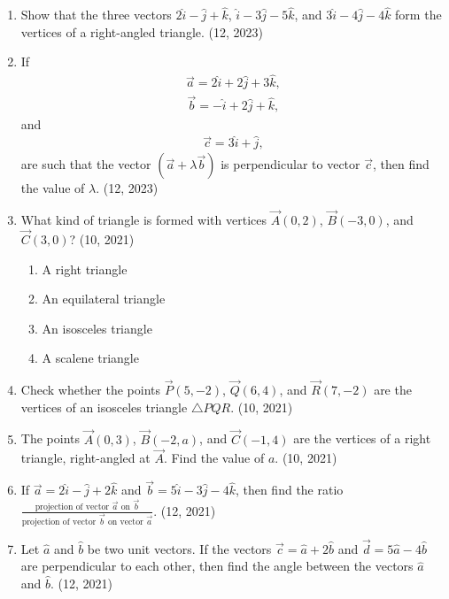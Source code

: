 \begin{enumerate}[label=\thesubsection.\arabic*, ref=\thesubsection.\theenumi]
    \item Show that the three vectors $2\hat{i} - \hat{j} + \hat{k}$, $\hat{i} - 3\hat{j} - 5\hat{k}$, and $3\hat{i} - 4\hat{j} - 4\hat{k}$ form the vertices of a right-angled triangle. 
    \hfill (12, 2023)
    \item If
    \begin{align}
        \overrightarrow{a} = 2\hat{i} + 2\hat{j} + 3\hat{k},
    \end{align}
    \begin{align}
        \overrightarrow{b} = -\hat{i} + 2\hat{j} + \hat{k},
    \end{align}
    and
    \begin{align}
        \overrightarrow{c} = 3\hat{i} + \hat{j},
    \end{align}
    are such that the vector $(\overrightarrow{a} + \lambda \overrightarrow{b})$ is perpendicular to vector $\overrightarrow{c}$, then find the value of $\lambda$.
    \hfill (12, 2023)
		\item What kind of triangle is formed with vertices $\vec{A}(0, 2)$, $\vec{B}(-3, 0)$, and $\vec{C}(3, 0)$?
		\hfill (10, 2021)
		\begin{enumerate}
			\item A right triangle
			\item An equilateral triangle
			\item An isosceles triangle
			\item A scalene triangle
		\end{enumerate}
		\item Check whether the points $\vec{P}(5, -2)$, $\vec{Q}(6, 4)$, and $\vec{R}(7, -2)$ are the vertices of an isosceles triangle $\triangle PQR$. \hfill (10, 2021)
		\item The points $\vec{A}(0, 3)$, $\vec{B}(-2, a)$, and $\vec{C}(-1, 4)$ are the vertices of a right triangle, right-angled at $\vec{A}$. Find the value of $a$. \hfill (10, 2021)
	\item If $\vec{a} = 2\hat{i} - \hat{j} + 2\hat{k}$ and $\vec{b} = 5\hat{i} - 3\hat{j} - 4\hat{k}$, then find the ratio $\frac{\text{projection of vector } \vec{a} \text{ on } \vec{b}}{\text{projection of vector } \vec{b} \text{ on vector } \vec{a}}$. \hfill (12, 2021)
	\item Let $\hat{a}$ and $\hat{b}$ be two unit vectors. If the vectors $\vec{c} = \hat{a} + 2\hat{b}$ and $\vec{d} = 5\hat{a} - 4\hat{b}$ are perpendicular to each other, then find the angle between the vectors $\hat{a}$ and $\hat{b}$. \hfill (12, 2021)

\end{enumerate}
